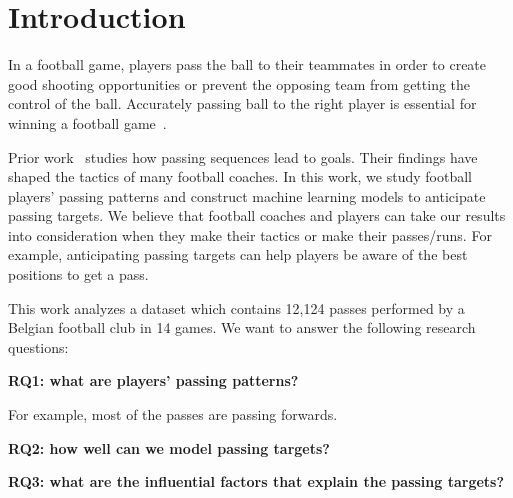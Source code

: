 \section{Introduction} \label{intro}
In a football game, players pass the ball to their teammates in order to create good shooting opportunities or prevent the opposing team from getting the control of the ball.
Accurately passing ball to the right player is essential for winning a football game~\cite{Ali2011Measuring,Hughes2005Analysis}.

Prior work~\cite{reep1968skill,Hughes2005Analysis} studies how passing sequences lead to goals. Their findings have shaped the tactics of many football coaches.
In this work, we study football players' passing patterns and construct machine learning models to anticipate passing targets.
We believe that football coaches and players can take our results into consideration when they make their tactics or make their passes/runs. For example, anticipating passing targets can help players be aware of the best positions to get a pass.

This work analyzes a dataset which contains 12,124 passes performed by a Belgian football club in 14 games. We want to answer the following research questions: 

\begin{description}
	\item \textbf{RQ1: what are players' passing patterns?}
	
	For example, most of the passes are passing forwards.
	
	\item \textbf{RQ2: how well can we model passing targets?}
	\item \textbf{RQ3: what are the influential factors that explain the passing targets?}
\end{description}